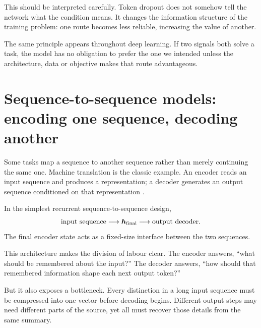This should be interpreted carefully. Token dropout does not somehow tell the network what the condition means. It changes the information structure of the training problem: one route becomes less reliable, increasing the value of another.

The same principle appears throughout deep learning. If two signals both solve a task, the model has no obligation to prefer the one we intended unless the architecture, data or objective makes that route advantageous.

\section{Sequence-to-sequence models: encoding one sequence, decoding another}

Some tasks map a sequence to another sequence rather than merely continuing the same one. Machine translation is the classic example. An encoder reads an input sequence and produces a representation; a decoder generates an output sequence conditioned on that representation \parencite{sutskever2014}.

In the simplest recurrent sequence-to-sequence design,
\[
  \text{input sequence}
  \longrightarrow
  \bm{h}_{\mathrm{final}}
  \longrightarrow
  \text{output decoder}.
\]
The final encoder state acts as a fixed-size interface between the two sequences.

This architecture makes the division of labour clear. The encoder answers, ``what should be remembered about the input?'' The decoder answers, ``how should that remembered information shape each next output token?''

But it also exposes a bottleneck. Every distinction in a long input sequence must be compressed into one vector before decoding begins. Different output steps may need different parts of the source, yet all must recover those details from the same summary.

